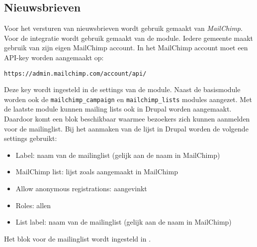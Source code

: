 \subsection{Nieuwsbrieven}\label{nieuwsbrieven}

Voor het versturen van nieuwsbrieven wordt gebruik gemaakt van \emph{MailChimp}. Voor de integratie wordt gebruik gemaakt van de  module. Iedere gemeente maakt gebruik van zijn eigen MailChimp account. In het MailChimp account moet een API-key worden aangemaakt op:
\begin{verbatim}
https://admin.mailchimp.com/account/api/
\end{verbatim}
Deze key wordt ingesteld in de settings van de  module. Naast de basismodule worden ook de \texttt{mailchimp\_campaign} en \texttt{mailchimp\_lists} modules aangezet. Met de laatste module kunnen mailing lists ook in Drupal worden aangemaakt. Daardoor komt een blok beschikbaar waarmee bezoekers zich kunnen aanmelden voor de mailinglist. Bij het aanmaken van de lijst in Drupal worden de volgende settings gebruikt:
\begin{itemize}
\item Label: naam van de mailinglist (gelijk aan de naam in MailChimp)
\item MailChimp list: lijst zoals aangemaakt in MailChimp
\item Allow anonymous registrations: aangevinkt
\item Roles: allen
\item List label: naam van de mailinglist (gelijk aan de naam in MailChimp)
\end{itemize}
Het blok voor de mailinglist wordt ingesteld in .